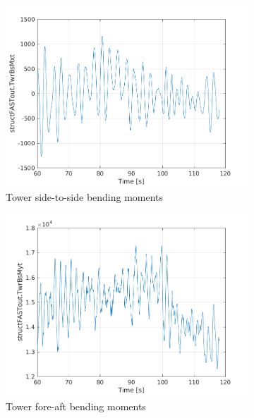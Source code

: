 \documentclass[10pt]{article}
\begin{document}
\begin{figure}[H]
  \centering
\begin{subfigure}{0.40\textwidth}
  \includegraphics[width=1\linewidth]{../CIP_6/FAST/Plots_ws5/TwrBsMxt.png}
\caption{Tower side-to-side bending moments}
\end{subfigure}
\begin{subfigure}{0.40\textwidth}
  \includegraphics[width=1\linewidth]{../CIP_6/FAST/Plots_ws5/TwrBsMyt.png}
\caption{Tower fore-aft bending moments}
\end{subfigure}
\begin{subfigure}{0.40\textwidth}

\end{subfigure}
\end{figure}
\end{document}
